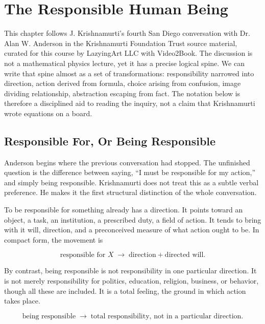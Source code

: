\chapter{The Responsible Human Being}

This chapter follows J. Krishnamurti's fourth San Diego conversation with Dr. Alan W. Anderson in the Krishnamurti Foundation Trust source material, curated for this course by LazyingArt LLC with Video2Book. The discussion is not a mathematical physics lecture, yet it has a precise logical spine. We can write that spine almost as a set of transformations: responsibility narrowed into direction, action derived from formula, choice arising from confusion, image dividing relationship, abstraction escaping from fact. The notation below is therefore a disciplined aid to reading the inquiry, not a claim that Krishnamurti wrote equations on a board.

\section{Responsible For, Or Being Responsible}

Anderson begins where the previous conversation had stopped. The unfinished question is the difference between saying, ``I must be responsible for my action,'' and simply being responsible. Krishnamurti does not treat this as a subtle verbal preference. He makes it the first structural distinction of the whole conversation.

To be responsible for something already has a direction. It points toward an object, a task, an institution, a prescribed duty, a field of action. It tends to bring with it will, direction, and a preconceived measure of what action ought to be. In compact form, the movement is

\begin{equation}
\text{responsible for } X
\;\longrightarrow\;
\text{direction}+\text{directed will}.
\end{equation}

By contrast, being responsible is not responsibility in one particular direction. It is not merely responsibility for politics, education, religion, business, or behavior, though all these are included. It is a total feeling, the ground in which action takes place.

\begin{equation}
\text{being responsible}
\;\longrightarrow\;
\text{total responsibility, not in a particular direction}.
\end{equation}

